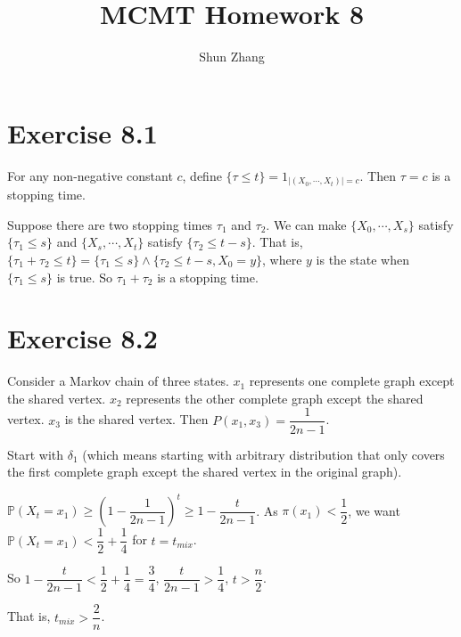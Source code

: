 \documentclass[10pt]{article}
\title{MCMT Homework 8}
\author{Shun Zhang}
\date{}
\renewcommand{\P}{\mathbb{P}}
\begin{document}
\maketitle

\section*{Exercise 8.1}

For any non-negative constant $c$, define $\{\tau \leq t\} = 1_{|(X_0, \cdots,
X_t)| = c}$.  Then $\tau = c$ is a stopping time.

Suppose there are two stopping times $\tau_1$ and $\tau_2$.
We can make $\{X_0, \cdots, X_s\}$ satisfy $\{\tau_1 \leq s\}$ and $\{X_{s},
\cdots, X_t\}$ satisfy $\{\tau_2 \leq t - s\}$.
That is, $\{\tau_1 + \tau_2 \leq t\} = \{\tau_1 \leq s\} \land \{\tau_2 \leq t -
s, X_0 = y\}$, where $y$ is the state when $\{\tau_1 \leq s\}$ is true.
So $\tau_1 + \tau_2$ is a stopping time.

\section*{Exercise 8.2}

Consider a Markov chain of three states. $x_1$ represents one complete graph
except the shared vertex. $x_2$ represents the other complete graph except the
shared vertex. $x_3$ is the shared vertex. Then $P(x_1, x_3) = \dfrac{1}{2n-1}$.

Start with $\delta_1$ (which means starting with arbitrary distribution that
only covers the first complete graph except the shared vertex in the original
graph).

$\P(X_t = x_1) \geq (1 - \dfrac{1}{2n-1})^t \geq 1 - \dfrac{t}{2n-1}$.
As $\pi(x_1) < \dfrac{1}{2}$, we want $\P(X_t = x_1) < \dfrac{1}{2} +
\dfrac{1}{4}$ for $t = t_{mix}$.

So $1 - \dfrac{t}{2n-1} < \dfrac{1}{2} + \dfrac{1}{4} = \dfrac{3}{4}$,
$\dfrac{t}{2n-1} > \dfrac{1}{4}$,
$t > \dfrac{n}{2}$.

That is, $t_{mix} > \dfrac{2}{n}$.
\end{document}
